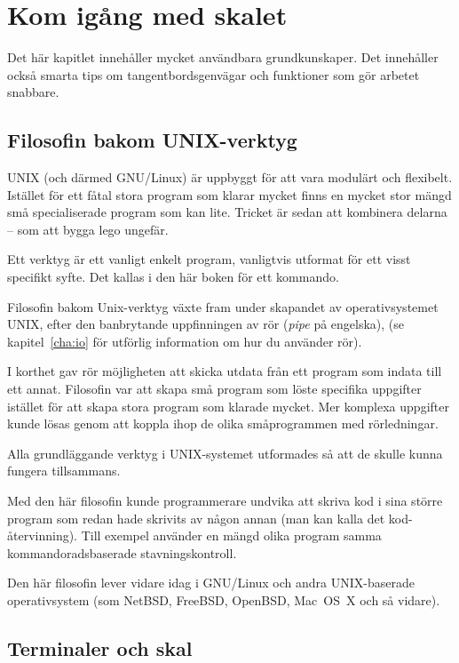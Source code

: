 \documentclass[10pt,a4paper,final]{book}
\newcommand{\charef}[1]{kapitel~\ref{#1}}
\newcommand{\xeng}[1]{\textit{#1} på engelska}
\newcommand{\xintro}[1]{{\Large #1\par}\vspace{.5\baselineskip}}
\begin{document}
\chapter{Kom igång med skalet}\label{cha:komigang}

\xintro{Det här kapitlet innehåller mycket användbara grundkunskaper. Det innehåller också smarta tips om tangentbordsgenvägar och funktioner som gör arbetet snabbare.}

\section{Filosofin bakom UNIX-verktyg}\label{sec:filosofi}

UNIX (och därmed GNU/Linux) är uppbyggt för att vara modulärt och flexibelt. Istället för ett fåtal stora program som klarar mycket finns en mycket stor mängd små specialiserade program som kan lite. Tricket är sedan att kombinera delarna -- som att bygga lego ungefär.

Ett verktyg är ett vanligt enkelt program, vanligtvis utformat för ett visst specifikt syfte. Det kallas i den här boken för ett kommando.

Filosofin bakom Unix-verktyg växte fram under skapandet av operativsystemet UNIX, efter den banbrytande uppfinningen av rör (\xeng{pipe}), \textbar{} (se \charef{cha:io} för utförlig information om hur du använder rör).

I korthet gav rör möjligheten att skicka utdata från ett program som indata till ett annat. Filosofin var att skapa små program som löste specifika uppgifter istället för att skapa stora program som klarade mycket. Mer komplexa uppgifter kunde lösas genom att koppla ihop de olika småprogrammen med rörledningar.

Alla grundläggande verktyg i UNIX-systemet utformades så att de skulle kunna fungera tillsammans. 

Med den här filosofin kunde programmerare undvika att skriva kod i sina större program som redan hade skrivits av någon annan (man kan kalla det kod-återvinning). Till exempel använder en mängd olika program samma kommandoradsbaserade stavningskontroll. 

Den här filosofin lever vidare idag i GNU/Linux och andra UNIX-baserade operativsystem (som NetBSD, FreeBSD, OpenBSD, Mac~OS~X och så vidare).

\section{Terminaler och skal}
\end{document}
